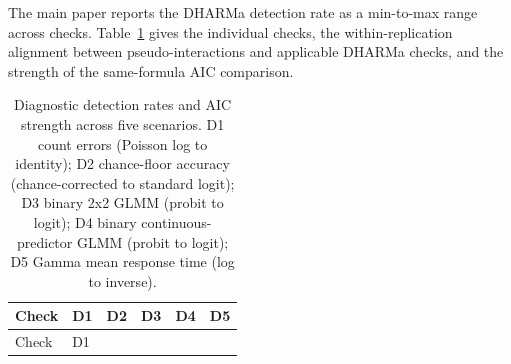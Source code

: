 \documentclass[
  man,
  floatsintext,
  longtable,
  nolmodern,
  notxfonts,
  notimes,
  colorlinks=true,linkcolor=blue,citecolor=blue,urlcolor=blue]{apa7}
\begin{document}
The main paper reports the DHARMa detection rate as a min-to-max range
across checks. Table~\ref{tbl-diagnostic-breakdown} gives the individual
checks, the within-replication alignment between pseudo-interactions and
applicable DHARMa checks, and the strength of the same-formula AIC
comparison.

\begin{longtable}[]{@{}
  >{\raggedright\arraybackslash}p{}
  >{\raggedright\arraybackslash}p{}
  >{\raggedright\arraybackslash}p{}
  >{\raggedright\arraybackslash}p{}
  >{\raggedright\arraybackslash}p{}
  >{\raggedright\arraybackslash}p{}@{}}
\caption{Diagnostic detection rates and AIC strength across five
scenarios. D1 count errors (Poisson log to identity); D2 chance-floor
accuracy (chance-corrected to standard logit); D3 binary 2x2 GLMM
(probit to logit); D4 binary continuous-predictor GLMM (probit to
logit); D5 Gamma mean response time (log to
inverse).}\label{tbl-diagnostic-breakdown}\tabularnewline
\toprule\noalign{}
\begin{minipage}[b]{\linewidth}\raggedright
Check
\end{minipage} & \begin{minipage}[b]{\linewidth}\raggedright
D1
\end{minipage} & \begin{minipage}[b]{\linewidth}\raggedright
D2
\end{minipage} & \begin{minipage}[b]{\linewidth}\raggedright
D3
\end{minipage} & \begin{minipage}[b]{\linewidth}\raggedright
D4
\end{minipage} & \begin{minipage}[b]{\linewidth}\raggedright
D5
\end{minipage} \\
\midrule\noalign{}
\endfirsthead
\toprule\noalign{}
\begin{minipage}[b]{\linewidth}\raggedright
Check
\end{minipage} & \begin{minipage}[b]{\linewidth}\raggedright
D1
\end{minipage} & \begin{minipage}[b]{\linewidth}\raggedright

\end{minipage}
\end{longtable}
\end{document}
